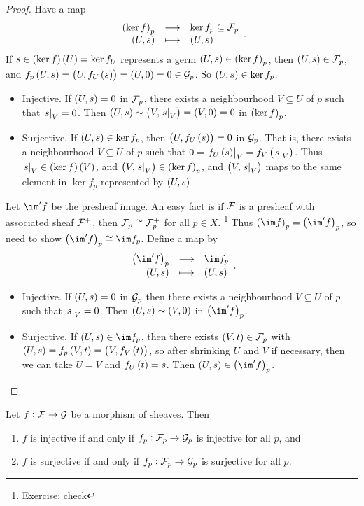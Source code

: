 \begin{proof}
Have a map
$$ \function{\br{\ker f}_p}{\ker f_p \subseteq \FFF_p}{\br{U, s}}{\br{U, s}}. $$
If $ s \in \br{\ker f}\br{U} = \ker f_U $ represents a germ $ \br{U, s} \in \br{\ker f}_p $, then $ \br{U, s} \in \FFF_p $, and $ f_p\br{U, s} = \br{U, f_U\br{s}} = \br{U, 0} = 0 \in \GGG_p $. So $ \br{U, s} \in \ker f_p $.
\begin{itemize}
\item Injective. If $ \br{U, s} = 0 $ in $ \mathcal{F}_p $, there exists a neighbourhood $ V \subseteq U $ of $ p $ such that $ \left. s \right|_V = 0 $. Then $ \br{U, s} \sim \br{V, \eval{s}_V} = \br{V, 0} = 0 $ in $ \br{\ker f}_p $.
\item Surjective. If $ \br{U, s} \in \ker f_p $, then $ \br{U, f_U\br{s}} = 0 $ in $ \mathcal{G}_p $. That is, there exists a neighbourhood $ V \subseteq U $ of $ p $ such that $ 0 = \eval{f_U\br{s}}_V = f_V\br{\eval{s}_V} $. Thus $ \eval{s}_V \in \br{\ker f}\br{V} $, and $ \br{V, \eval{s}_V} \in \br{\ker f}_p $, and $ \br{V, \eval{s}_V} $ maps to the same element in $ \ker f_p $ represented by $ \br{U, s} $.
\end{itemize}

\pagebreak

Let $ \im' f $ be the presheaf image. An easy fact is if $ \mathcal{F} $ is a presheaf with associated sheaf $ \mathcal{F}^+ $, then $ \mathcal{F}_p \cong \mathcal{F}_p^+ $ for all $ p \in X $. \footnote{Exercise: check} Thus $ \br{\im f}_p = \br{\im' f}_p $, so need to show $ \br{\im' f}_p \cong \im f_p $. Define a map by
$$ \function{\br{\im' f}_p}{\im f_p}{\br{U, s}}{\br{U, s}}. $$
\begin{itemize}
\item Injective. If $ \br{U, s} = 0 $ in $ \mathcal{G}_p $ then there exists a neighbourhood $ V \subseteq U $ of $ p $ such that $ \left. s \right|_V = 0 $. Then $ \br{U, s} \sim \br{V, 0} $ in $ \br{\im' f}_p $.
\item Surjective. If $ \br{U, s} \in \im f_p $, then there exists $ \br{V, t} \in \FFF_p $ with $ \br{U, s} = f_p\br{V, t} = \br{V, f_V\br{t}} $, so after shrinking $ U $ and $ V $ if necessary, then we can take $ U = V $ and $ f_U\br{t} = s $. Then $ \br{U, s} \in \br{\im' f}_p $.
\end{itemize}
\end{proof}

\begin{proposition}
Let $ f : \mathcal{F} \to \mathcal{G} $ be a morphism of sheaves. Then
\begin{enumerate}
\item $ f $ is injective if and only if $ f_p : \mathcal{F}_p \to \mathcal{G}_p $ is injective for all $ p $, and
\item $ f $ is surjective if and only if $ f_p : \mathcal{F}_p \to \mathcal{G}_p $ is surjective for all $ p $.
\end{enumerate}
\end{proposition}

